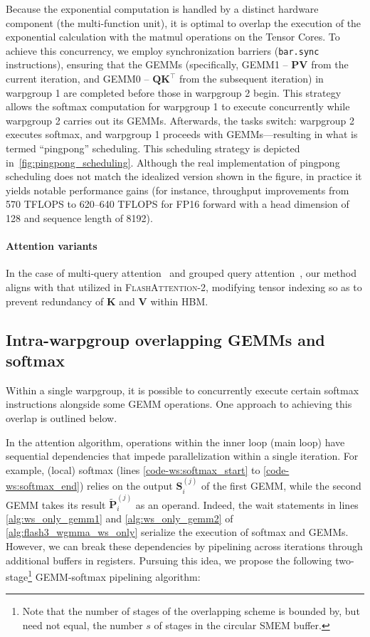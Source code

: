 \begin{enumerate}
Because the exponential computation is handled by a distinct hardware component (the multi-function unit), it is optimal to overlap the execution of the exponential calculation with the matmul operations on the Tensor Cores. To achieve this concurrency, we employ synchronization barriers (\texttt{bar.sync} instructions), ensuring that the GEMMs (specifically, GEMM1 -- $\mathbf{P} \mathbf{V}$ from the current iteration, and GEMM0 -- $\mathbf{Q} \mathbf{K}^\top$ from the subsequent iteration) in warpgroup 1 are completed before those in warpgroup 2 begin. This strategy allows the softmax computation for warpgroup 1 to execute concurrently while warpgroup 2 carries out its GEMMs. Afterwards, the tasks switch: warpgroup 2 executes softmax, and warpgroup 1 proceeds with GEMMs—resulting in what is termed “pingpong” scheduling. This scheduling strategy is depicted in~\cref{fig:pingpong_scheduling}. Although the real implementation of pingpong scheduling does not match the idealized version shown in the figure, in practice it yields notable performance gains (for instance, throughput improvements from 570 TFLOPS to 620–640 TFLOPS for FP16 forward with a head dimension of 128 and sequence length of 8192).

\paragraph{Attention variants} In the case of multi-query attention~\citep{shazeer2019fast} and grouped query attention~\citep{ainslie2023gqa}, our method aligns with that utilized in \textsc{FlashAttention-2}, modifying tensor indexing so as to prevent redundancy of $\mathbf{K}$ and $\mathbf{V}$ within HBM.

\subsection{Intra-warpgroup overlapping GEMMs and softmax}

Within a single warpgroup, it is possible to concurrently execute certain softmax instructions alongside some GEMM operations. One approach to achieving this overlap is outlined below.

In the attention algorithm, operations within the inner loop (main loop) have sequential dependencies that impede parallelization within a single iteration. For example, (local) softmax (lines \ref{code-ws:softmax_start} to \ref{code-ws:softmax_end}) relies on the output $\mathbf{S}_i^{(j)}$ of the first GEMM, while the second GEMM takes its result $\widetilde{\mathbf{P}}_i^{(j)}$ as an operand. Indeed, the wait statements in lines \ref{alg:ws_only_gemm1} and \ref{alg:ws_only_gemm2} of \cref{alg:flash3_wgmma_ws_only} serialize the execution of softmax and GEMMs. However, we can break these dependencies by pipelining across iterations through additional buffers in registers. Pursuing this idea, we propose the following two-stage\footnote{Note that the number of stages of the overlapping scheme is bounded by, but need not equal, the number $s$ of stages in the circular SMEM buffer.} GEMM-softmax pipelining algorithm:


\end{enumerate}
